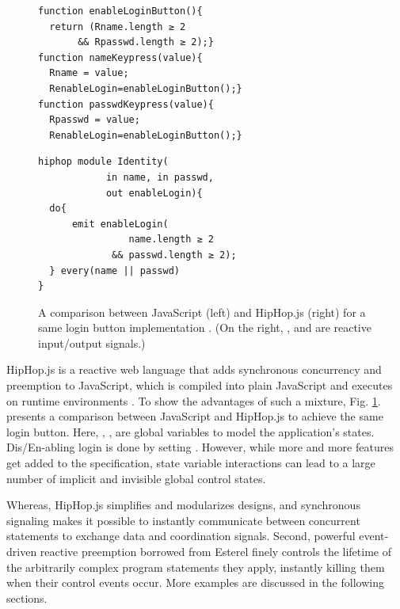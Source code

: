 \documentclass[acmsmall,review,anonymous]{acmart}\settopmatter{printfolios=true,printccs=false,printacmref=false}
\newcommand\figref[1]{Fig. \textcolor{black}{\ref{#1}}.}
\begin{document}
\begin{figure}[h]
\noindent
   \vspace{-2mm}
\begin{varwidth}{.5\textwidth}
\begin{lstlisting}
function enableLoginButton(){
  return (Rname.length ≥ 2 
	   && Rpasswd.length ≥ 2);}
function nameKeypress(value){
  Rname = value;
  RenableLogin=enableLoginButton();}
function passwdKeypress(value){ 
  Rpasswd = value;
  RenableLogin=enableLoginButton();}
\end{lstlisting}
\end{varwidth}%
\begin{varwidth}{.5\textwidth}
\begin{lstlisting}
hiphop module Identity(
			in name, in passwd, 
			out enableLogin){
  do{
	  emit enableLogin(
		  		name.length ≥ 2 
		  	 && passwd.length ≥ 2); 
  } every(name || passwd)
}
\end{lstlisting}  
\end{varwidth}
      \vspace{0mm}
\caption{A comparison between JavaScript (left) and HipHop.js (right) for a same login button implementation \cite{berry2020hiphop}. (On the right, {}, {} and {} are reactive input/output signals.)}
  \label{fig:login_compare}  
      \vspace{0mm}
\end{figure}





HipHop.js is a reactive web language that adds synchronous concurrency and preemption to JavaScript, which is compiled into plain  JavaScript and executes on runtime environments \cite{berry2020hiphop}. 
To show the advantages of such a mixture, \figref{fig:login_compare} presents a comparison between JavaScript and HipHop.js to achieve the same login button. Here, {}, {}, {} are global variables to model the application's states. Dis/En-abling login is done by setting {}. However, while more and more features get added to the specification, state variable interactions can lead to a large number of implicit and  invisible global control states.


Whereas, HipHop.js simplifies and modularizes designs, and synchronous signaling makes it possible to instantly communicate between concurrent statements to exchange data and coordination signals. 
Second, powerful event-driven reactive preemption borrowed from Esterel finely controls the lifetime of the arbitrarily complex program statements they apply, instantly killing them when their control events occur. 
More examples are discussed in the following sections.
\end{document}
